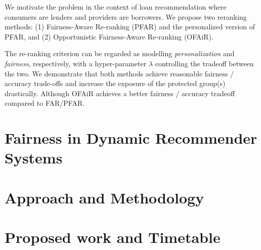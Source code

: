 \documentclass[manuscript,screen,review]{acmart}
\begin{document}
We motivate the problem in the context of loan recommendation where consumers are lenders and providers are borrowers. We propose two reranking methods: (1) Fairness-Aware Re-ranking (PFAR) and the personalized version of PFAR, and (2) Opportunistic Fairness-Aware Re-ranking (OFAiR).

The re-ranking criterion can be regarded as modelling \textit{personalization} and \textit{fairness}, respectively, with a hyper-parameter $\lambda$ controlling the tradeoff between the two. We demonstrate that both methods achieve reasonable fairness / accuracy trade-offs and increase the exposure of the protected group(s) drastically. Although OFAiR achieves a better fairness / accuracy tradeoff compared to FAR/PFAR.




\section{Fairness in Dynamic Recommender Systems}


\section{Approach and Methodology}


\section{Proposed work and Timetable}




\end{document}
